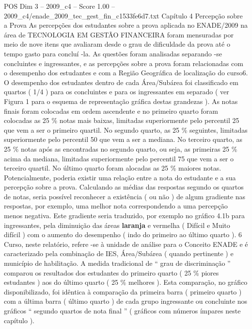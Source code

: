 \begin{textsample}{POS Dim 3 – 2009\_c4 – Score 1.00 – 2009\_c4/enade\_2009\_tec\_gest\_fin\_c1533fe6d7.txt}  \label{ex:f3_pos_130}
Capítulo 4 Percepção sobre a Prova As percepções dos estudantes sobre a prova aplicada no ENADE/2009 na área de TECNOLOGIA EM GESTÃO FINANCEIRA foram mensuradas por meio de nove itens que avaliaram desde o grau de dificuldade da prova até o tempo gasto para concluí -la.
As questões foram analisadas separando -se concluintes e ingressantes, e as percepções sobre a prova foram relacionadas com o desempenho dos estudantes e com a Região Geográfica de localização do curso6.
O desempenho dos estudantes dentro de cada Área/Subárea foi classificado em quartos ( 1/4 ) para os concluintes e para os ingressantes em separado ( ver Figura 1 para o esquema de representação gráfica destas grandezas ).
As notas finais foram colocadas em ordem ascendente e no primeiro quarto foram colocadas as 25 \% notas mais baixas, limitadas superiormente pelo percentil 25 que vem a ser o primeiro quartil.
No segundo quarto, as 25 \% seguintes, limitadas superiormente pelo percentil 50 que vem a ser a mediana.
No terceiro quarto, as 25 \% notas após as encontradas no segundo quarto, ou seja, as primeiras 25 \% acima da mediana, limitadas superiormente pelo percentil 75 que vem a ser o terceiro quartil.
No último quarto foram alocadas as 25 \% maiores notas.
Potencialmente, poderia existir uma relação entre a nota do estudante e a sua percepção sobre a prova.
Calculando as médias das respostas segundo os quartos de notas, seria possível reconhecer a existência ( ou não ) de algum gradiente nas respostas, por exemplo, uma melhor nota correspondendo a uma percepção menos negativa.
Este gradiente seria traduzido, por exemplo no gráfico 4.1b para ingressantes, pela diminuição das áreas \textbf{laranja} e vermelha ( Difícil e Muito difícil ) com o aumento do desempenho ( indo do primeiro ao último quarto ). 6 Curso, neste relatório, refere -se à unidade de análise para o Conceito ENADE e é caracterizado pela combinação de IES, Área/Subárea ( quando pertinente ) e município de habilitação.
A medida tradicional de “ grau de discriminação ” comparou os resultados dos estudantes do primeiro quarto ( 25 \% piores estudantes ) aos do último quarto ( 25 \% melhores ).
Esta comparação, no gráfico disponibilizado, foi idêntica à comparação da primeira barra ( primeiro quarto ) com a última barra ( último quarto ) de cada grupo ingressante ou concluinte nos gráficos “ segundo quartos de nota final ” ( gráficos com números ímpares neste capítulo ).

\end{textsample}
